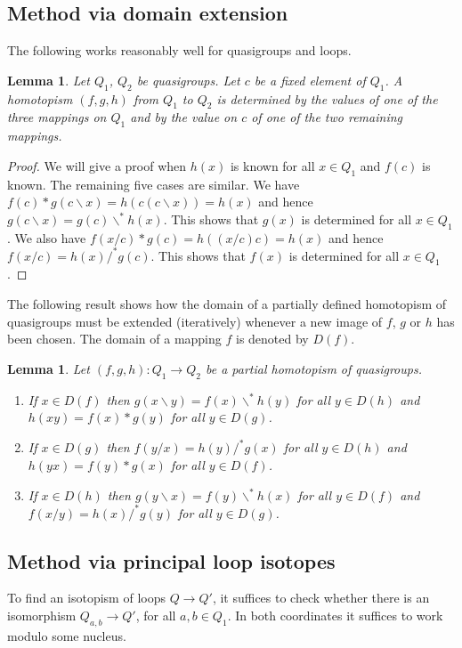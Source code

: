 \documentclass{amsart}
\def\rdiv{/}
\def\ldiv{\backslash}
\def\isordiv{/^*}
\def\isoldiv{\backslash^*}
\theoremstyle{plain}
\newtheorem{lemma}[theorem]{Lemma}
\theoremstyle{definition}
\begin{document}
\subsection{Method via domain extension}

The following works reasonably well for quasigroups and loops.

\begin{lemma}
Let $Q_1$, $Q_2$ be quasigroups. Let $c$ be a fixed element of $Q_1$. A homotopism $(f,g,h)$ from $Q_1$ to $Q_2$ is determined by the values of one of the three mappings on $Q_1$ and by the value on $c$ of one of the two remaining mappings.
\end{lemma}
\begin{proof}
We will give a proof when $h(x)$ is known for all $x\in Q_1$ and $f(c)$ is known. The remaining five cases are similar.
We have $f(c)*g(c\ldiv x) = h(c(c\ldiv x)) = h(x)$ and hence $g(c\ldiv x) = g(c)\isoldiv h(x)$. This shows that $g(x)$ is determined for all $x\in Q_1$. We also have $f(x\rdiv c)*g(c) = h((x\rdiv c)c) = h(x)$ and hence $f(x\rdiv c) = h(x)\isordiv g(c)$. This shows that $f(x)$ is determined for all $x\in Q_1$.
\end{proof}

The following result shows how the domain of a partially defined homotopism of quasigroups must be extended (iteratively) whenever a new image of $f$, $g$ or $h$ has been chosen. The domain of a mapping $f$ is denoted by $D(f)$.

\begin{lemma}
Let $(f,g,h):Q_1\to Q_2$ be a partial homotopism of quasigroups.
\begin{enumerate}
\item[(i)] If $x\in D(f)$ then $g(x\ldiv y) = f(x)\isoldiv h(y)$ for all $y\in D(h)$ and $h(xy) = f(x)*g(y)$ for all $y\in D(g)$.
\item[(ii)] If $x\in D(g)$ then $f(y\rdiv x) = h(y)\isordiv g(x)$ for all $y\in D(h)$ and $h(yx) = f(y)*g(x)$ for all $y\in D(f)$.
\item[(iii)] If $x\in D(h)$ then $g(y\ldiv x) =f(y)\isoldiv h(x)$ for all $y\in D(f)$ and $f(x\rdiv y) = h(x)\isordiv g(y)$ for all $y\in D(g)$.
\end{enumerate}
\end{lemma}

\subsection{Method via principal loop isotopes}

To find an isotopism of loops $Q\to Q'$, it suffices to check whether there is an isomorphism $Q_{a,b}\to Q'$, for all $a,b\in Q_1$. In both coordinates it suffices to work modulo some nucleus.
\end{document}
